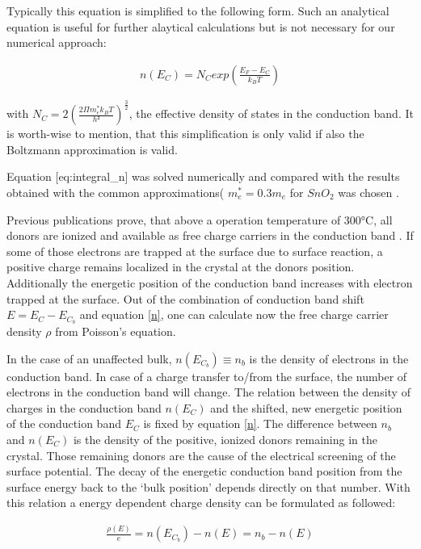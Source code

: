 \documentclass[11pt]{article}
\begin{document}
Typically this equation is simplified to the following form. Such an
analytical equation is useful for further alaytical calculations but is
not necessary for our numerical approach:

\begin{align}
n(E_{C})=N_{C}exp\left(\frac{E_{F}-E_{C}}{k_{B}T}\right)\label{n}\tag{$n(E_C)$}
\end{align}

with
\(N_{C}=2\left(\frac{2\Pi m_{e}^{*}k_{B}T}{h²}\right)^{\frac{3}{2}}\),
the effective density of states in the conduction band. It is worth-wise
to mention, that this simplification is only valid if also the Boltzmann
approximation is valid.

Equation {[}eq:integral\_n{]} was solved numerically and compared with
the results obtained with the common approximations(
\(m_{e}^{*}=0.3m_{e}\) for \(SnO_{2}\) \cite{Batzill2005} was chosen .

Previous publications prove, that above a operation temperature of
300°C, all donors are ionized and available as free charge carriers in
the conduction band \cite{Barsan2015}. If some of those electrons are
trapped at the surface due to surface reaction, a positive charge
remains localized in the crystal at the donors position. Additionally
the energetic position of the conduction band increases with electron
trapped at the surface. Out of the combination of conduction band shift
\(E=E_{C}-E_{C_{b}}\) and equation \ref{n}, one can calculate now the
free charge carrier density \(\rho\) from Poisson's equation.

In the case of an unaffected bulk, \(n(E_{C_{b}})\equiv n_{b}\) is the
density of electrons in the conduction band. In case of a charge
transfer to/from the surface, the number of electrons in the conduction
band will change. The relation between the density of charges in the
conduction band \(n(E_{C})\) and the shifted, new energetic position of
the conduction band \(E_{C}\) is fixed by equation \ref{n}. The
difference between \(n_{b}\) and \(n(E_{C})\) is the density of the
positive, ionized donors remaining in the crystal. Those remaining
donors are the cause of the electrical screening of the surface
potential. The decay of the energetic conduction band position from the
surface energy back to the `bulk position' depends directly on that
number. With this relation a energy dependent charge density can be
formulated as followed:

\begin{align}
\frac{\rho(E)}{e}=n(E_{C_b})-n(E) = n_{b}-n(E)
\end{align}
\end{document}
